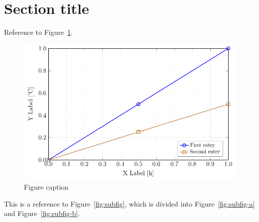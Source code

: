\section{Section title}\label{sec:section3}

Reference to Figure~\ref{fig:plot}.

\begin{figure}[hbt!]
  \centering
  \includegraphics[width=0.8\linewidth]{figures/plot1.pdf}
  \caption{Figure caption}\label{fig:plot}
\end{figure}

This is a reference to Figure~\ref{fig:subfig}, which is divided into
Figure~\ref{fig:subfig-a} and Figure~\ref{fig:subfig-b}.

